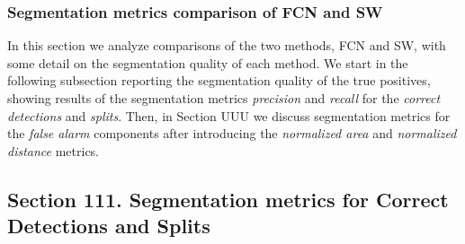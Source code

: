 \documentclass[a4paper,authoryear,review]{elsarticle}
\begin{document}
\subsubsection{Segmentation metrics comparison of FCN and SW}

In this section we analyze comparisons of the two methods, FCN and SW, with some detail on the segmentation quality of each method. We start in the following subsection reporting the segmentation quality of the true positives, showing results of the segmentation metrics \emph{precision} and \emph{recall} for the \emph{correct detections} and \emph{splits}. Then, in Section UUU we discuss segmentation metrics for the \emph{false alarm} components after introducing the \emph{normalized area} and \emph{normalized distance} metrics. 

\subsection{Section 111. Segmentation metrics for Correct Detections and Splits}
\end{document}
